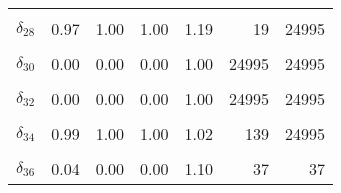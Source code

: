 \begin{table}
\begin{tabular}[t]{lrrrrrr}
\cellcolor{gray!6}{$\delta_{27}$} & \cellcolor{gray!6}{0.99} & \cellcolor{gray!6}{1.00} & \cellcolor{gray!6}{1.00} & \cellcolor{gray!6}{1.01} & \cellcolor{gray!6}{191} & \cellcolor{gray!6}{24995}\\
$\delta_{28}$ & 0.97 & 1.00 & 1.00 & 1.19 & 19 & 24995\\
\cellcolor{gray!6}{$\delta_{29}$} & \cellcolor{gray!6}{0.24} & \cellcolor{gray!6}{0.00} & \cellcolor{gray!6}{1.00} & \cellcolor{gray!6}{2.25} & \cellcolor{gray!6}{6} & \cellcolor{gray!6}{24995}\\
$\delta_{30}$ & 0.00 & 0.00 & 0.00 & 1.00 & 24995 & 24995\\
\cellcolor{gray!6}{$\delta_{31}$} & \cellcolor{gray!6}{1.00} & \cellcolor{gray!6}{1.00} & \cellcolor{gray!6}{1.00} & \cellcolor{gray!6}{1.00} & \cellcolor{gray!6}{24990} & \cellcolor{gray!6}{24995}\\
$\delta_{32}$ & 0.00 & 0.00 & 0.00 & 1.00 & 24995 & 24995\\
\cellcolor{gray!6}{$\delta_{33}$} & \cellcolor{gray!6}{0.00} & \cellcolor{gray!6}{0.00} & \cellcolor{gray!6}{0.00} & \cellcolor{gray!6}{1.00} & \cellcolor{gray!6}{24995} & \cellcolor{gray!6}{24995}\\
$\delta_{34}$ & 0.99 & 1.00 & 1.00 & 1.02 & 139 & 24995\\
\cellcolor{gray!6}{$\delta_{35}$} & \cellcolor{gray!6}{0.00} & \cellcolor{gray!6}{0.00} & \cellcolor{gray!6}{0.00} & \cellcolor{gray!6}{1.00} & \cellcolor{gray!6}{24995} & \cellcolor{gray!6}{24995}\\
$\delta_{36}$ & 0.04 & 0.00 & 0.00 & 1.10 & 37 & 37\\
\bottomrule
\end{tabular}
\end{table}